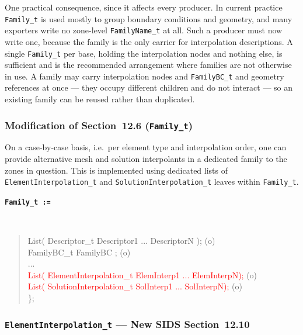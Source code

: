 \documentclass[11pt,letterpaper]{article}
\newenvironment{v2quote}
  {\begin{v2quoteframe}%
   \noindent{\footnotesize\sffamily\bfseries\color{cgnsblue}v2 text}%
   \nopagebreak\par\nopagebreak\vspace{0.15em}}
  {\end{v2quoteframe}}
\newif\ifvfourdraft
\newcommand{\vfour}[1]{\ifvfourdraft\textcolor{v4violet}{#1}\else#1\fi}
\newenvironment{sidsnode}[1]{%
  \par\vspace{0.8em}%
  \noindent\colorbox{cgnslight!50}{\parbox{\dimexpr\linewidth-2\fboxsep}{%
    \raggedright\texttt{\textbf{\color{cgnsblue}#1}}}}\\[0.3em]%
  \begin{quote}\ttfamily
}{%
  \end{quote}\vspace{0.4em}%
}
\begin{document}
\vfour{One practical consequence, since it affects every producer.  In current
practice \texttt{Family\_t} is used mostly to group boundary conditions and
geometry, and many exporters write no zone-level \texttt{FamilyName\_t} at all.
Such a producer must now write one, because the family is the only carrier for
interpolation descriptions.  A single \texttt{Family\_t} per base, holding the
interpolation nodes and nothing else, is sufficient and is the recommended
arrangement where families are not otherwise in use.  A family may carry
interpolation nodes and \texttt{FamilyBC\_t} and geometry references at once ---
they occupy different children and do not interact --- so an existing family can
be reused rather than duplicated.}

\subsubsection{Modification of Section~12.6 (\texttt{Family\_t})}

\begin{v2quote}
On a case-by-case basis, i.e.\ per element type and interpolation order, one can provide
alternative mesh and solution interpolants in a dedicated family to the zones in question.  This
is implemented using dedicated lists of \texttt{ElementInterpolation\_t} and
\texttt{SolutionInterpolation\_t} leaves within \texttt{Family\_t}.
\end{v2quote}

\begin{sidsnode}{Family\_t :=}
List( Descriptor\_t Descriptor1 ... DescriptorN );          \textrm{(o)}\\
FamilyBC\_t FamilyBC ;                                       \textrm{(o)}\\
...\\
\textcolor{red}{List( ElementInterpolation\_t  ElemInterp1 ... ElemInterpN);}  \textrm{(o)}\\
\textcolor{red}{List( SolutionInterpolation\_t SolInterp1  ... SolInterpN);}   \textrm{(o)}\\
\};
\end{sidsnode}

\subsubsection{\texttt{ElementInterpolation\_t} --- New SIDS Section~12.10}
\label{sec:element-interpolation}
\end{document}
